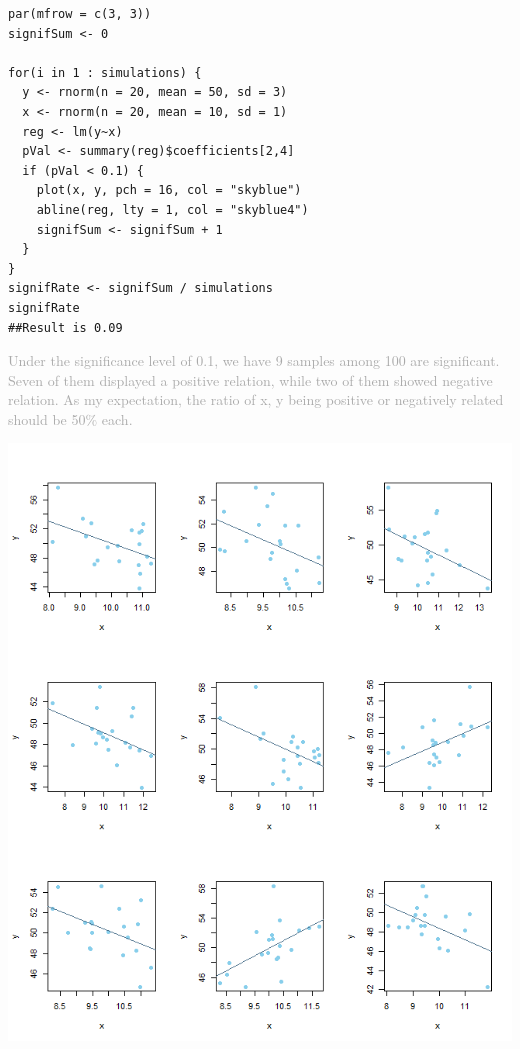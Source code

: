 \documentclass[12pt]{article}
\begin{document}
\begin{verbatim}
par(mfrow = c(3, 3))
signifSum <- 0

for(i in 1 : simulations) {
  y <- rnorm(n = 20, mean = 50, sd = 3)
  x <- rnorm(n = 20, mean = 10, sd = 1)
  reg <- lm(y~x)
  pVal <- summary(reg)$coefficients[2,4]
  if (pVal < 0.1) {
    plot(x, y, pch = 16, col = "skyblue")
    abline(reg, lty = 1, col = "skyblue4")
    signifSum <- signifSum + 1
  }
}
signifRate <- signifSum / simulations
signifRate
##Result is 0.09
\end{verbatim}

\noindent \textcolor{darkgray}{Under the significance level of 0.1, we have 9 samples among 100 are significant. Seven of them displayed a positive relation, while two of them showed negative relation. As my expectation, the ratio of x, y being positive or negatively related should be 50$\%$ each.}

\includegraphics[width = 6 in]{RandPlot2-pv01.png}
\end{document}
